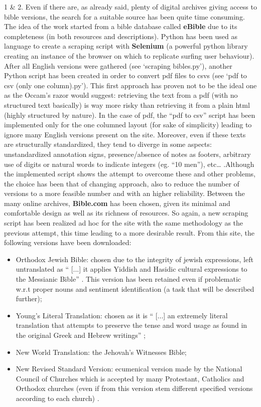\documentclass[sigchi]{article}
\begin{document}
1 \& 2. Even if there are, as already said, plenty of digital archives giving access to bible versions, the search for a suitable source has been quite time consuming. The idea of the work started from a bible database called \textbf{eBible} \cite{ebible} due to its completeness (in both resources and descriptions). Python has been used as language to create a scraping script with \textbf{Selenium} \cite{selenium} (a powerful python library creating an instance of the browser on which to replicate surfing user behaviour). After all English versions were gathered (see ‘scraping bibles.py’), another Python script has been created in order to convert pdf files to csvs (see ‘pdf to csv (only one column).py’). This first approach has proven not to be the ideal one as the Occam’s razor would suggest: retrieving the text from a pdf (with no structured text basically) is way more risky than retrieving it from a plain html (highly structured by nature). In the case of pdf, the “pdf to csv” script has been implemented  only for the one columned layout (for sake of simplicity) leading to ignore many English versions present on the site. Moreover, even if these texts are structurally standardized, they tend to diverge in some aspects: unstandardized annotation signs, presence/absence of notes as footers, arbitrary use of digits or natural words to indicate integers (eg. “10 men”), etc… .Although the implemented script shows the attempt to overcome these and other problems, the choice has been that of changing approach, also to reduce the number of versions to a more feasible number and with an higher reliability. Between the many online archives, \textbf{Bible.com} \cite{biblecom} has been chosen, given its minimal and comfortable design as well as its richness of resources. So again, a new scraping script has been realized ad hoc for the site with the same methodology as the previous attempt, this time leading to a more desirable result. From this site, the following versions have been downloaded:
\begin{itemize}
    \item Orthodox Jewish Bible: chosen due to the integrity of jewish expressions, left untranslated as  “ [...] it applies Yiddish and Hasidic cultural expressions to the Messianic Bible” \cite{OJB}. This version has been retained even if problematic w.r.t proper nouns and sentiment identification (a task that will be described further);
    \item Young’s Literal Translation: chosen as it is  “ [...] an extremely literal translation that attempts to preserve the tense and word usage as found in the original Greek and Hebrew writings” \cite{YLT};
    \item New World Translation: the Jehovah’s Witnesses Bible;
    \item New Revised Standard Version: ecumenical version made by  the National Council of Churches which is accepted by many Protestant, Catholics and Orthodox churches (even if from this version stem different specified versions according to each church) \cite{NRSV}.
\end{itemize}
\end{document}
